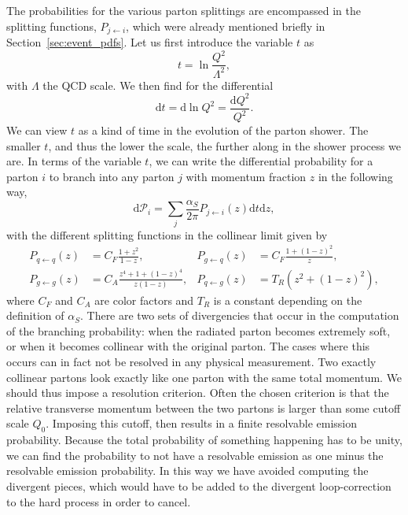 The probabilities for the various parton splittings are encompassed in the splitting functions,
$P_{j\leftarrow i}$, which were already mentioned briefly in Section~\ref{sec:event_pdfs}.
Let us first introduce the variable $t$ as
\begin{equation}
  t = \ln\frac{Q^2}{\Lambda^2},
\end{equation}
with $\Lambda$ the QCD scale. We then find for the differential
\begin{equation}
  \text{d}t = \text{d}\ln Q^2 = \frac{\text{d}Q^2}{Q^2}.
\end{equation}
We can view $t$ as a kind of time in the evolution of the parton shower. The smaller $t$, and
thus the lower the scale, the further along in the shower process we are. 
In terms of the variable $t$, we can write the differential probability for a parton $i$ to branch
into any parton $j$ with momentum fraction $z$ in the following way,
\begin{equation}
  \text{d}\mathcal{P}_i = \sum_j \frac{\alpha_S}{2\pi} P_{j\leftarrow i}(z)\text{d}t\text{d}z,
\label{eq:splitting}
\end{equation}
with the different splitting functions in the collinear limit given by
\begin{align}
  P_{q\leftarrow q}(z) &= C_F \frac{1 + z^2}{1 - z}, & 
  P_{g\leftarrow q}(z) &= C_F \frac{1 + (1-z)^2}{z}, \\
  P_{g\leftarrow g}(z) &= C_A \frac{z^4 + 1 + (1-z)^4}{z(1-z)}, &
  P_{q\leftarrow g}(z) &= T_R (z^2 + (1-z)^2), 
\end{align}
where $C_F$ and $C_A$ are color factors and $T_R$ is a constant depending on the definition of
$\alpha_S$. 
There are two sets of divergencies that occur in the computation of the branching probability: when
the radiated parton becomes extremely soft, or when it becomes collinear with the original parton. 
The cases where this occurs can in fact not be resolved in any physical measurement. Two exactly
collinear partons look exactly like one parton with the same total momentum. We should thus impose
a resolution criterion. Often the chosen criterion is that the relative transverse momentum
between the two partons is larger than some cutoff scale $Q_0$. Imposing this cutoff, then results
in a finite resolvable emission probability. Because the total probability of something happening
has to be unity, we can find the probability to not have a resolvable emission as one minus the
resolvable emission probability. In this way we have avoided computing the divergent pieces, which
would have to be added to the divergent loop-correction to the hard process in order to cancel.

